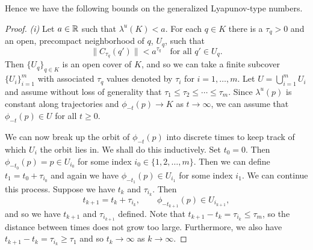 Hence we have the following bounds on the generalized Lyapunov-type numbers.
\lyapunovbound*
\begin{proof}
	\emph{(i)} Let \(a\in\mathbb{R}\) such that \(\lambda^u(K) < a\). For each \(q\in K\) there is a \(\tau_q>0\) and an open, precompact neighborhood of \(q\), \(U_q\), such that \[\| C_{\tau_q}(q')\| < a^{\tau_q} \quad \text{for all } q'\in U_q.\] Then \(\{ U_q \}_{q\in K}\) is an open cover of \(K\), and so we can take a finite subcover \(\{U_i\}_{i=1}^m\) with associated \(\tau_q\) values denoted by \(\tau_i\) for \(i = 1,\ldots, m\). Let \(U = \bigcup_{i=1}^m U_i\) and assume without loss of generality that \(\tau_1\leq \tau_2\leq\cdots\leq \tau_m\). Since \(\lambda^u(p)\) is constant along trajectories and \(\phi_{-t}(p) \to K\) as \(t\to\infty\), we can assume that \(\phi_{-t}(p) \in U\) for all \(t\geq 0.\) 
	
	We can now break up the orbit of \(\phi_{-t}(p)\) into discrete times to keep track of which \(U_i\) the orbit lies in. We shall do this inductively. Set \(t_0 = 0\). Then \(\phi_{-t_0}(p) = p \in U_{i_0}\) for some index \(i_0\in \{1,2,\ldots, m\}\). Then we can define \(t_1 = t_0 + \tau_{i_0}\) and again we have \(\phi_{-t_1}(p) \in U_{i_1}\) for some index \(i_1\). We can continue this process. Suppose we have \(t_k\) and \(\tau_{i_k}\). Then
	\begin{equation*}
		t_{k+1} = t_k + \tau_{i_k}, \qquad \phi_{-t_{k+1}}(p) \in U_{i_{k+1}},
	\end{equation*}
	and so we have \(t_{k+1}\) and \(\tau_{i_{k+1}}\) defined. Note that \(t_{k+1} - t_k = \tau_{i_k} \leq \tau_{m}\), so the distance between times does not grow too large. Furthermore, we also have \(t_{k+1} - t_k = \tau_{i_k} \geq \tau_1\) and so \(t_k \to \infty\) as \(k\to\infty.\)
	

\end{proof}
